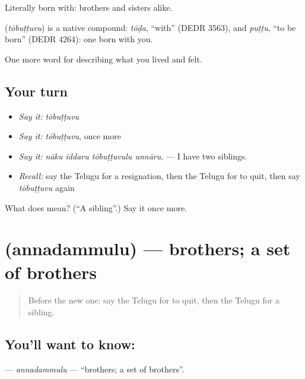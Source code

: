 Literally born with: brothers and sisters alike.

\begin{cousinweb}
\textbf{} (\emph{tōbuṭṭuvu}) is a native compound: \emph{tōḍa}, \textquotedblleft{}with\textquotedblright{} (DEDR 3563), and \emph{puṭṭu}, \textquotedblleft{}to be born\textquotedblright{} (DEDR 4264): one born with you.
\end{cousinweb}

\begin{grammarlens}[title={What you've built}]
One more word for describing what you lived and felt.
\end{grammarlens}

\subsection*{Your turn}
\begin{itemize}
\raggedright
  \item \emph{Say it:} \emph{tōbuṭṭuvu}
  \item \emph{Say it:} \emph{tōbuṭṭuvu}, once more
  \item \emph{Say it:} \emph{nāku iddaru tōbuṭṭuvulu unnāru.} — I have two siblings.
  \item \emph{Recall:} say the Telugu for a resignation, then the Telugu for to quit, then say \emph{tōbuṭṭuvu} again
\end{itemize}

\begin{tcolorbox}[breakable,colback=teal!4,colframe=teal!35!black,title={Before you move on}]
What does  mean? (\textquotedblleft{}A sibling\textquotedblright{}.) Say it once more.
\end{tcolorbox}
\section[\texorpdfstring{\te{అన్నదమ్ములు} (annadammulu)}{అన్నదమ్ములు (annadammulu)}]{ (annadammulu) — brothers; a set of brothers}

\label{lesson:TE-C528-annadammulu}



\begin{quote}
Before the new one: say the Telugu for to quit, then the Telugu for a sibling.
\end{quote}

\subsection*{You'll want to know: }
\textbf{} — \emph{annadammulu} — \textquotedblleft{}brothers; a set of brothers\textquotedblright{}.

